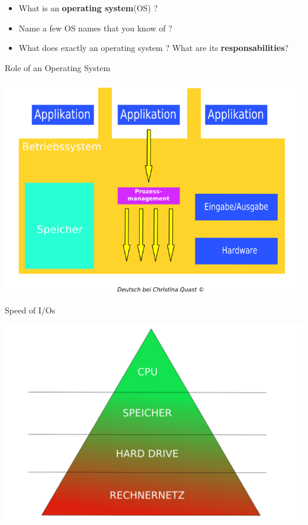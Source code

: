 {  \begin{frame}
    \begin{center}
      \begin{itemize}
        \item What is an \textbf{operating system}(OS) ?
        \item Name a few OS names that you know of ?
        \item What does exactly an operating system ? What are its \textbf{responsabilities}?
      \end{itemize}
    \end{center}
  \end{frame}

  \begin{frame}{Role of an Operating System}
    \begin{center}
      \includegraphics[scale=0.3]{img/operating-system.png}
    \end{center}
  \end{frame}

  \begin{frame}{Speed of I/Os}
    \begin{center}
      \includegraphics[scale=0.3]{img/pyramid-io.png}
    \end{center}
  \end{frame}

}

